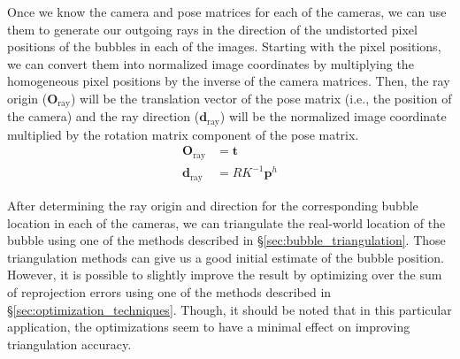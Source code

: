 \documentclass[11pt, letterpaper]{extarticle} %
\begin{document}
Once we know the camera and pose matrices for each of the cameras, we can use them to generate our outgoing rays in the direction of the undistorted pixel positions of the bubbles in each of the images. Starting with the pixel positions, we can convert them into normalized image coordinates by multiplying the homogeneous pixel positions by the inverse of the camera matrices. Then, the ray origin ($\mathbf{O}_{\text{ray}}$) will be the translation vector of the pose matrix (i.e., the position of the camera) and the ray direction ($\mathbf{d}_{\text{ray}}$) will be the normalized image coordinate multiplied by the rotation matrix component of the pose matrix.
\begin{align}
    \label{eq:ray_origin}    \mathbf{O}_{\text{ray}} &= \mathbf{t} \\
    \label{eq:ray_direction} \mathbf{d}_{\text{ray}} &= R K^{-1}\mathbf{p}^h
\end{align}

After determining the ray origin and direction for the corresponding bubble location in each of the cameras, we can triangulate the real-world location of the bubble using one of the methods described in \S\ref{sec:bubble_triangulation}. Those triangulation methods can give us a good initial estimate of the bubble position. However, it is possible to slightly improve the result by optimizing over the sum of reprojection errors using one of the methods described in \S\ref{sec:optimization_techniques}. Though, it should be noted that in this particular application, the optimizations seem to have a minimal effect on improving triangulation accuracy.

\end{document}
